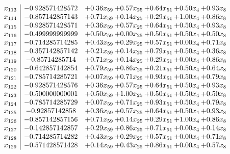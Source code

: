 \documentclass[8pt]{article}
\begin{document}
\[\begin{array}{c| c c@{\hskip 2pt} c@{\hskip 2pt} c@{\hskip 2pt} c@{\hskip 2pt} c@{\hskip 2pt} }
 x_{113}   &  -0.928571428572 & +  0.36 x_{59} & +  0.57 x_{25} & +  0.64 x_{51} & +  0.50 x_{4} & +  0.93 x_{8}\\
 x_{114}   &  -0.857142857143 & +  0.71 x_{59} & +  0.14 x_{25} & +  0.29 x_{51} & +  1.00 x_{4} & +  0.86 x_{8}\\
 x_{115}   &  -0.928571428571 & +  0.36 x_{59} & +  0.57 x_{25} & +  0.64 x_{51} & +  0.50 x_{4} & +  0.93 x_{8}\\
 x_{116}   &  -0.499999999999 & +  0.50 x_{59} & +  0.00 x_{25} & +  0.50 x_{51} & +  0.50 x_{4} & +  0.50 x_{8}\\
 x_{117}   &  -0.714285714285 & +  0.43 x_{59} & +  0.29 x_{25} & +  0.57 x_{51} & +  0.00 x_{4} & +  0.71 x_{8}\\
 x_{118}   &  -0.357142857142 & +  0.21 x_{59} & +  0.14 x_{25} & +  0.79 x_{51} & +  0.50 x_{4} & +  0.36 x_{8}\\
 x_{119}   &  -0.85714285714 & +  0.71 x_{59} & +  0.14 x_{25} & +  0.29 x_{51} & +  0.00 x_{4} & +  0.86 x_{8}\\
 x_{120}   &  -0.642857142854 & +  0.79 x_{59} & +  0.86 x_{25} & +  0.21 x_{51} & +  0.50 x_{4} & +  0.64 x_{8}\\
 x_{121}   &  -0.785714285721 & +  0.07 x_{59} & +  0.71 x_{25} & +  0.93 x_{51} & +  0.50 x_{4} & +  0.79 x_{8}\\
 x_{122}   &  -0.928571428576 & +  0.36 x_{59} & +  0.57 x_{25} & +  0.64 x_{51} & +  0.50 x_{4} & +  0.93 x_{8}\\
 x_{123}   &  -0.500000000001 & +  0.50 x_{59} & +  1.00 x_{25} & +  0.50 x_{51} & +  0.50 x_{4} & +  0.50 x_{8}\\
 x_{124}   &  -0.785714285729 & +  0.07 x_{59} & +  0.71 x_{25} & +  0.93 x_{51} & +  0.50 x_{4} & +  0.79 x_{8}\\
 x_{125}   &  -0.92857142858 & +  0.36 x_{59} & +  0.57 x_{25} & +  0.64 x_{51} & +  0.50 x_{4} & +  0.93 x_{8}\\
 x_{126}   &  -0.857142857156 & +  0.71 x_{59} & +  0.14 x_{25} & +  0.29 x_{51} & +  1.00 x_{4} & +  0.86 x_{8}\\
 x_{127}   &  -0.142857142857 & +  0.29 x_{59} & +  0.86 x_{25} & +  0.71 x_{51} & +  0.00 x_{4} & +  0.14 x_{8}\\
 x_{128}   &  -0.714285714282 & +  0.43 x_{59} & +  0.29 x_{25} & +  0.57 x_{51} & +  0.00 x_{4} & +  0.71 x_{8}\\
 x_{129}   &  -0.571428571428 & +  0.14 x_{59} & +  0.43 x_{25} & +  0.86 x_{51} & +  0.00 x_{4} & +  0.57 x_{8}\\

\end{array}\]
\end{document}
